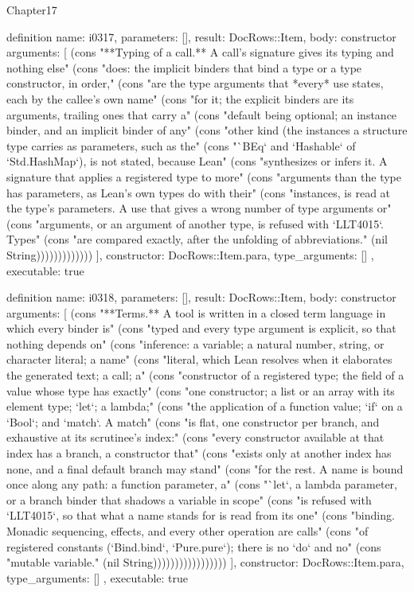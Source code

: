 \begin{lexlean}{Chapter17}
\begin{semanticmodule}
definition{
  name: i0317,
  parameters: [],
  result: DocRows::Item,
  body: constructor{
    arguments: [
      (cons "**Typing of a call.** A call's signature gives its typing and nothing else" (cons "does: the implicit binders that bind a type or a type constructor, in order," (cons "are the type arguments that *every* use states, each by the callee's own name" (cons "for it; the explicit binders are its arguments, trailing ones that carry a" (cons "default being optional; an instance binder, and an implicit binder of any" (cons "other kind (the instances a structure type carries as parameters, such as the" (cons "`BEq` and `Hashable` of `Std.HashMap`), is not stated, because Lean" (cons "synthesizes or infers it. A signature that applies a registered type to more" (cons "arguments than the type has parameters, as Lean's own types do with their" (cons "instances, is read at the type's parameters. A use that gives a wrong number of type arguments or" (cons "arguments, or an argument of another type, is refused with `LLT4015`. Types" (cons "are compared exactly, after the unfolding of abbreviations." (nil String)))))))))))))
    ],
    constructor: DocRows::Item.para,
    type_arguments: []
  },
  executable: true
}

definition{
  name: i0318,
  parameters: [],
  result: DocRows::Item,
  body: constructor{
    arguments: [
      (cons "**Terms.** A tool is written in a closed term language in which every binder is" (cons "typed and every type argument is explicit, so that nothing depends on" (cons "inference: a variable; a natural number, string, or character literal; a name" (cons "literal, which Lean resolves when it elaborates the generated text; a call; a" (cons "constructor of a registered type; the field of a value whose type has exactly" (cons "one constructor; a list or an array with its element type; `let`; a lambda;" (cons "the application of a function value; `if` on a `Bool`; and `match`. A match" (cons "is flat, one constructor per branch, and exhaustive at its scrutinee's index:" (cons "every constructor available at that index has a branch, a constructor that" (cons "exists only at another index has none, and a final default branch may stand" (cons "for the rest. A name is bound once along any path: a function parameter, a" (cons "`let`, a lambda parameter, or a branch binder that shadows a variable in scope" (cons "is refused with `LLT4015`, so that what a name stands for is read from its one" (cons "binding. Monadic sequencing, effects, and every other operation are calls" (cons "of registered constants (`Bind.bind`, `Pure.pure`); there is no `do` and no" (cons "mutable variable." (nil String)))))))))))))))))
    ],
    constructor: DocRows::Item.para,
    type_arguments: []
  },
  executable: true
}


\end{semanticmodule}
\end{lexlean}
